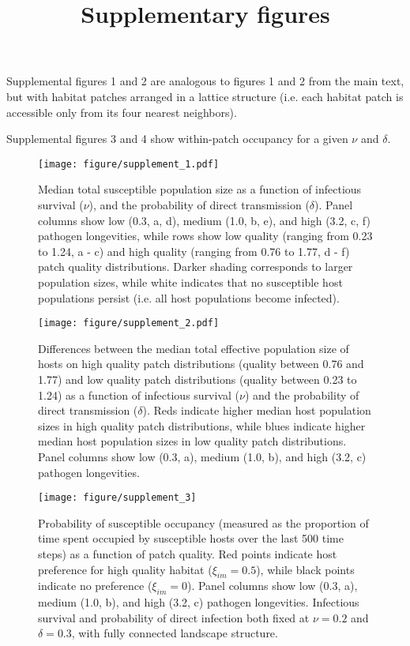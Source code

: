 \documentclass{article}
\title{Supplementary figures}
\begin{document}
\maketitle

Supplemental figures 1 and 2 are analogous to figures 1 and 2 from the main text, but with habitat patches arranged in a lattice structure (i.e. each habitat patch is accessible only from its four nearest neighbors).

Supplemental figures 3 and 4 show within-patch occupancy for a given $\nu$ and $\delta$.

\begin{figure}
\texttt{[image: figure/supplement\_1.pdf]}
\caption{Median total susceptible population size as a function of infectious survival ($\nu$), and the probability of direct transmission ($\delta$).  Panel columns show low (0.3, a, d), medium (1.0, b, e), and high (3.2, c, f) pathogen longevities, while rows show low quality (ranging from 0.23 to 1.24, a - c) and high quality (ranging from 0.76 to 1.77, d - f) patch quality distributions.  Darker shading corresponds to larger population sizes, while white indicates that no susceptible host populations persist (i.e. all host populations become infected).}
\label{endemic}
\end{figure}

\begin{figure}
\texttt{[image: figure/supplement\_2.pdf]}
\centering
\caption{Differences between the median total effective population size of hosts on high quality patch distributions (quality between 0.76 and 1.77) and low quality patch distributions (quality between 0.23 to 1.24) as a function of infectious survival ($\nu$) and the probability of direct transmission ($\delta$).  Reds indicate higher median host population sizes in high quality patch distributions, while blues indicate higher median host population sizes in low quality patch distributions.  Panel columns show low (0.3, a), medium (1.0, b), and high (3.2, c) pathogen longevities.}
\label{highvlow}
\end{figure}

\begin{figure}
\texttt{[image: figure/supplement\_3]}
\centering
\caption{Probability of susceptible occupancy (measured as the proportion of time spent occupied by susceptible hosts over the last 500 time steps) as a function of patch quality. Red points indicate host preference for high quality habitat ($\xi_{im} = 0.5$), while black points indicate no preference ($\xi_{im} = 0$). Panel columns show low (0.3, a), medium (1.0, b), and high (3.2, c) pathogen longevities.  Infectious survival and probability of direct infection both fixed at $\nu = 0.2$ and $\delta = 0.3$, with fully connected landscape structure.}
\end{figure}
\end{document}
